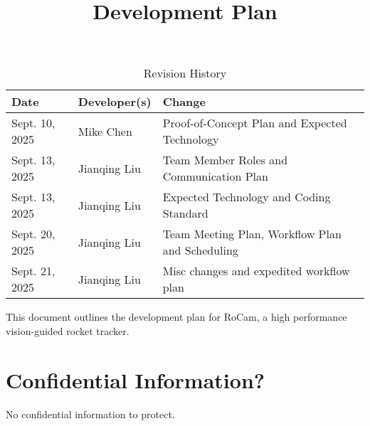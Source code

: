 \documentclass{article}
\title{Development Plan\\\progname}
\author{\authname}
\date{}
\begin{document}
\maketitle

\begin{table}[hp]
  \caption{Revision History} \label{TblRevisionHistory}
  \begin{tabularx}{\textwidth}{llX}
    \toprule
    \textbf{Date}  & \textbf{Developer(s)} & \textbf{Change}                                 \\
    \midrule
    Sept. 10, 2025 & Mike Chen             & Proof-of-Concept Plan and Expected Technology   \\
    Sept. 13, 2025 & Jianqing Liu          & Team Member Roles and Communication Plan        \\
    Sept. 13, 2025 & Jianqing Liu          & Expected Technology and Coding Standard         \\
    Sept. 20, 2025 & Jianqing Liu          & Team Meeting Plan, Workflow Plan and Scheduling \\
    Sept. 21, 2025 & Jianqing Liu          & Misc changes and expedited workflow plan        \\
    \bottomrule
  \end{tabularx}
\end{table}

\newpage{}

This document outlines the development plan for RoCam, a high performance
vision-guided rocket tracker.



\section{Confidential Information?}


No confidential information to protect.

\end{document}
